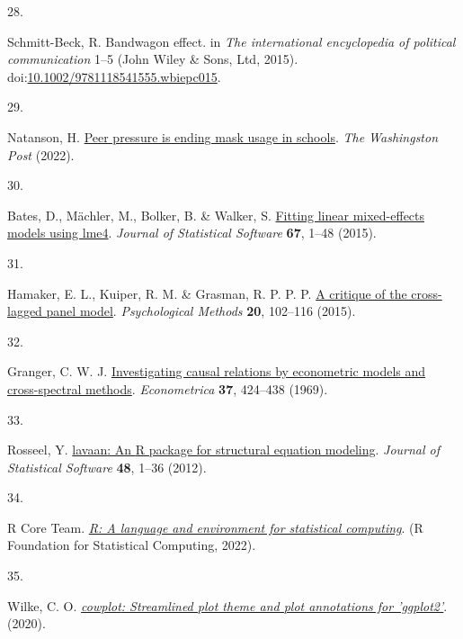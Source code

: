 \documentclass[
  man, donotrepeattitle,floatsintext]{apa6}
\newlength{\cslhangindent}
\newlength{\csllabelwidth}
\newlength{\cslentryspacingunit} %
\newenvironment{CSLReferences}[2] %
 {%
  \setlength{\parindent}{0pt}
  \ifodd #1
  \let\oldpar\par
  \def\par{\hangindent=\cslhangindent\oldpar}
  \fi
  \setlength{\parskip}{#2\cslentryspacingunit}
 }%
 {}
\newcommand{\CSLLeftMargin}[1]{\parbox[t]{\csllabelwidth}{#1}}
\newcommand{\CSLRightInline}[1]{\parbox[t]{\linewidth - \csllabelwidth}{#1}\break}
\begin{document}
\begin{CSLReferences}{0}{0}
\leavevmode{}%
\CSLLeftMargin{28. }%
\CSLRightInline{Schmitt-Beck, R. Bandwagon effect. in \emph{The international encyclopedia of political communication} 1--5 (John Wiley \& Sons, Ltd, 2015). doi:\href{https://doi.org/10.1002/9781118541555.wbiepc015}{10.1002/9781118541555.wbiepc015}.}

\leavevmode{}%
\CSLLeftMargin{29. }%
\CSLRightInline{Natanson, H. \href{https://www.washingtonpost.com/education/2022/02/25/peer-pressure-mask-optional-schools/}{Peer pressure is ending mask usage in schools}. \emph{The Washingston Post} (2022).}

\leavevmode{}%
\CSLLeftMargin{30. }%
\CSLRightInline{Bates, D., Mächler, M., Bolker, B. \& Walker, S. \href{https://doi.org/10.18637/jss.v067.i01}{Fitting linear mixed-effects models using lme4}. \emph{Journal of Statistical Software} \textbf{67}, 1--48 (2015).}

\leavevmode{}%
\CSLLeftMargin{31. }%
\CSLRightInline{Hamaker, E. L., Kuiper, R. M. \& Grasman, R. P. P. P. \href{https://doi.org/10.1037/a0038889}{A critique of the cross-lagged panel model}. \emph{Psychological Methods} \textbf{20}, 102--116 (2015).}

\leavevmode{}%
\CSLLeftMargin{32. }%
\CSLRightInline{Granger, C. W. J. \href{https://doi.org/10.2307/1912791}{Investigating causal relations by econometric models and cross-spectral methods}. \emph{Econometrica} \textbf{37}, 424--438 (1969).}

\leavevmode{}%
\CSLLeftMargin{33. }%
\CSLRightInline{Rosseel, Y. \href{https://doi.org/10.18637/jss.v048.i02}{{lavaan}: An {R} package for structural equation modeling}. \emph{Journal of Statistical Software} \textbf{48}, 1--36 (2012).}

\leavevmode{}%
\CSLLeftMargin{34. }%
\CSLRightInline{R Core Team. \emph{\href{https://www.R-project.org/}{R: A language and environment for statistical computing}}. (R Foundation for Statistical Computing, 2022).}

\leavevmode{}%
\CSLLeftMargin{35. }%
\CSLRightInline{Wilke, C. O. \emph{\href{https://CRAN.R-project.org/package=cowplot}{{cowplot}: Streamlined plot theme and plot annotations for 'ggplot2'}}. (2020).}


\end{CSLReferences}
\end{document}
